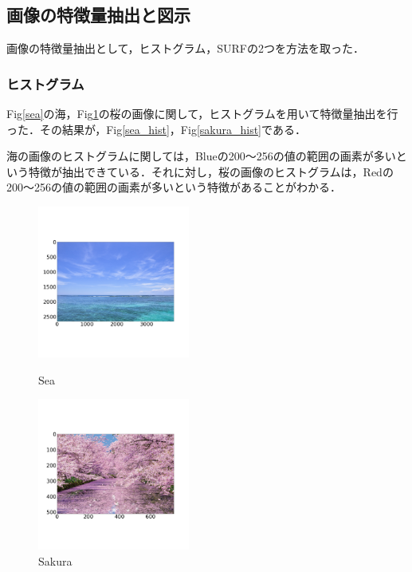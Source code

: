 \documentclass[11pt,a4j]{jarticle}
\begin{document}
\subsection{画像の特徴量抽出と図示}
画像の特徴量抽出として，ヒストグラム，SURFの2つを方法を取った．

\subsubsection{ヒストグラム}
Fig\ref{sea}の海，Fig\ref{sakura}の桜の画像に関して，ヒストグラムを用いて特徴量抽出を行った．その結果が，Fig\ref{sea_hist}，Fig\ref{sakura_hist}である．

海の画像のヒストグラムに関しては，Blueの200～256の値の範囲の画素が多いという特徴が抽出できている．それに対し，桜の画像のヒストグラムは，Redの200～256の値の範囲の画素が多いという特徴があることがわかる．

\begin{figure}[ht]
	\begin{minipage}{0.5\hsize}
		\centering
		\includegraphics[width=5cm]{../1_BasicImageProcessing/output/sea.jpg}
		\vspace{-1cm}
		\renewcommand{\figurename}{Fig}
		\caption{Sea}
		\label{sea}
	\end{minipage}
	\begin{minipage}{0.5\hsize}
		\centering
		\includegraphics[width=5cm]{../1_BasicImageProcessing/output/sakura.jpg}
		\vspace{-1cm}
		\renewcommand{\figurename}{Fig}
		\caption{Sakura}
		\label{sakura}
	\end{minipage}
\end{figure}
\end{document}

